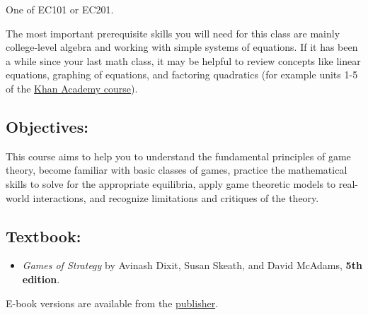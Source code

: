 One of EC101 or EC201.

The most important prerequisite skills you will need for this class are mainly college-level algebra
and working with simple systems of equations.
If it has been a while since your last math class, 
it may be helpful to review concepts like linear equations, graphing of equations, and factoring quadratics
(for example units 1-5 of the \href{https://www.khanacademy.org/math/college-algebra}{Khan Academy course}).

\subsection{Objectives:}

This course aims to help you to understand the fundamental principles of game theory, become familiar with basic classes of games, practice the mathematical skills to solve for the appropriate equilibria, apply game theoretic models to real-world interactions, and recognize limitations and critiques of the theory.

\subsection{Textbook:}

\begin{itemize}
  \item 
\textit{Games of Strategy} by Avinash Dixit, Susan Skeath, and David McAdams, \textbf{5th edition}.
\end{itemize}
  E-book versions are available from the \href{https://wwnorton.com/books/Games-of-Strategy}{publisher}.

  


